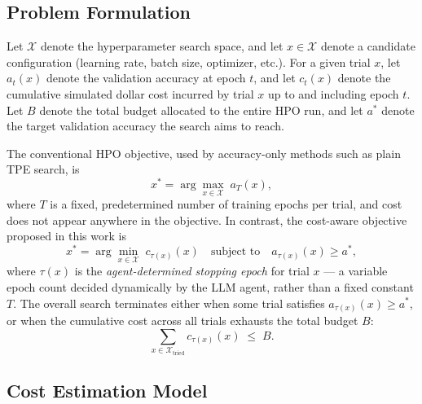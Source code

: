 \documentclass[11pt]{article}
\begin{document}
\subsection{Problem Formulation}

Let $\mathcal{X}$ denote the hyperparameter search space, and let $x \in \mathcal{X}$ denote a candidate configuration (learning rate, batch size, optimizer, etc.). For a given trial $x$, let $a_t(x)$ denote the validation accuracy at epoch $t$, and let $c_t(x)$ denote the cumulative simulated dollar cost incurred by trial $x$ up to and including epoch $t$. Let $B$ denote the total budget allocated to the entire HPO run, and let $a^{*}$ denote the target validation accuracy the search aims to reach.

The conventional HPO objective, used by accuracy-only methods such as plain TPE search, is
\begin{equation}
x^{*} = \arg\max_{x \in \mathcal{X}} \; a_{T}(x),
\label{eq:conventional}
\end{equation}
where $T$ is a fixed, predetermined number of training epochs per trial, and cost does not appear anywhere in the objective. In contrast, the cost-aware objective proposed in this work is
\begin{equation}
x^{*} = \arg\min_{x \in \mathcal{X}} \; c_{\tau(x)}(x) \quad \text{subject to} \quad a_{\tau(x)}(x) \geq a^{*},
\label{eq:proposed}
\end{equation}
where $\tau(x)$ is the \emph{agent-determined stopping epoch} for trial $x$ --- a variable epoch count decided dynamically by the LLM agent, rather than a fixed constant $T$. The overall search terminates either when some trial satisfies $a_{\tau(x)}(x) \geq a^{*}$, or when the cumulative cost across all trials exhausts the total budget $B$:
\begin{equation}
\sum_{x \in \mathcal{X}_{\text{tried}}} c_{\tau(x)}(x) \; \leq \; B.
\label{eq:budget_constraint}
\end{equation}

\subsection{Cost Estimation Model}
\end{document}
